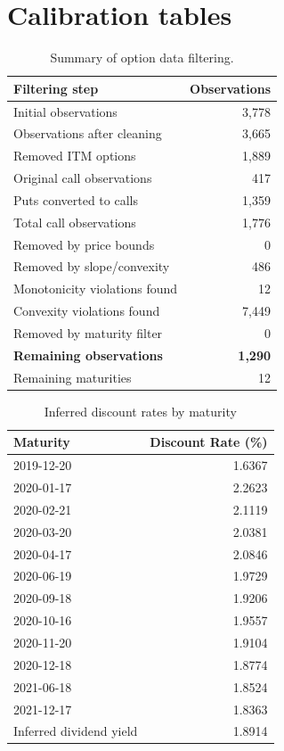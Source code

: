 \chapter{Calibration tables}
\label{app:calibration-tables}

\begin{table}[H]
  \centering
  \begin{tabular}{lr}
    \toprule
    \textbf{Filtering step} & \textbf{Observations} \\
    \midrule
    Initial observations & 3,778 \\
    Observations after cleaning & 3,665 \\
    \midrule
    Removed ITM options & 1,889 \\
    \quad Original call observations & 417 \\
    \quad Puts converted to calls & 1,359 \\
    Total call observations & 1,776 \\
    \midrule
    Removed by price bounds & 0 \\
    Removed by slope/convexity & 486 \\
    \quad Monotonicity violations found & 12 \\
    \quad Convexity violations found & 7,449 \\
    Removed by maturity filter & 0 \\
    \midrule
    \textbf{Remaining observations} & \textbf{1,290} \\
    Remaining maturities & 12 \\
    \bottomrule
  \end{tabular}
  \caption{Summary of option data filtering.}
  \label{tab:option-filtering}
\end{table}

\begin{table}[H]
    \centering
    \begin{tabular}{lr}
        \toprule
        Maturity & Discount Rate (\%) \\
        \midrule
        2019-12-20 & 1.6367 \\
        2020-01-17 & 2.2623 \\
        2020-02-21 & 2.1119 \\
        2020-03-20 & 2.0381 \\
        2020-04-17 & 2.0846 \\
        2020-06-19 & 1.9729 \\
        2020-09-18 & 1.9206 \\
        2020-10-16 & 1.9557 \\
        2020-11-20 & 1.9104 \\
        2020-12-18 & 1.8774 \\
        2021-06-18 & 1.8524 \\
        2021-12-17 & 1.8363 \\
        \midrule
        Inferred dividend yield & 1.8914 \\
        \bottomrule
    \end{tabular}
    \caption{Inferred discount rates by maturity}
    \label{tab:inferred_r_q}
\end{table}

